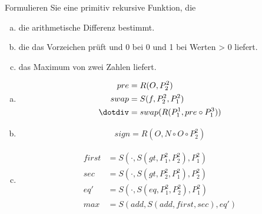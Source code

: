 \begin{card}
  Formulieren Sie eine primitiv rekursive Funktion, die
  \begin{enumerate}[a)]
    \item die arithmetische Differenz bestimmt.
    \item die das Vorzeichen prüft und 0 bei 0 und 1 bei Werten > 0 liefert.
    \item das Maximum von zwei Zahlen liefert.
	\end{enumerate}
	\hr
  \begin{enumerate}[a)]
    \item
      \begin{align*}
        pre &= R(O, P^2_2) \\
        swap &= S(f, P^2_2, P^2_1) \\
        \dotdiv &= swap(R(P^1_1, pre \circ P^3_1))
      \end{align*}
    \item
       \begin{align*}
         sign = R(O, N \circ O \circ P^2_2)
       \end{align*}
    \item
      \begin{align*}
        first &= S(\cdot, S(gt, P^2_1, P^2_2), P^2_1) \\
        sec &= S(\cdot, S(gt, P^2_2, P^2_1), P^2_2) \\
        eq' &= S(\cdot, S(eq, P^2_1, P^2_2), P^2_1) \\
        max &= S(add, S(add, first, sec), eq')
      \end{align*}
	\end{enumerate}
\end{card}


